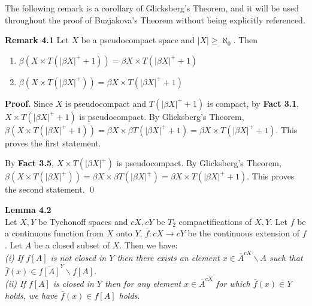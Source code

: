 \documentclass{article}
\begin{document}
																				      The following remark is a corollary of Glicksberg's Theorem, and it will be used throughout the proof of Buzjakova's Theorem without being explicitly referenced.

																				      \vskip 20pt






																				      \textbf{Remark 4.1} Let $X$ be a pseudocompact space and $|X|\geq \aleph_0.$ Then 


																				      \begin{enumerate}
																				      \item $\beta(X\times T(|\beta X|^+ +1))=\beta X\times T(|\beta X|^+ +1)$
																				      \item $\beta(X\times T(|\beta X|^+))=\beta X\times T(|\beta X|^+ +1)$

																				      \end{enumerate}


																				      \vskip 20pt


																				      \textbf{Proof.} Since $X$ is pseudocompact and  $T(|\beta X|^+ +1)$ is compact, by \textbf{Fact 3.1}, $X\times T(|\beta X|^+ +1)$ is pseudocompact. By Glicksberg's Theorem, $\beta(X\times T(|\beta X|^+ +1))=\beta X\times \beta T(|\beta X|^+ +1)=\beta X\times T(|\beta X|^+ +1).$ This proves the first statement.
																				      \vskip 15pt

																				      By \textbf{Fact 3.5}, $X\times T(|\beta X|^+)$ is pseudocompact. By Glicksberg's Theorem, $\beta(X\times T(|\beta X|^+))=\beta X\times \beta T(|\beta X|^+)=\beta X\times T(|\beta X|^+ +1)$. This proves the second statement. \qed

																				      \vskip 40pt


																				      \textbf{Lemma 4.2}\\
																					  Let $X,Y$ be Tychonoff spaces and $cX, cY$ be $T_2$ compactifications of $X,Y$.
																					  Let $f$ be a continuous function from $X$ onto $Y$, $\bar{f}: cX\rightarrow cY$ be the continuous extension of $f$. Let $A$ be a closed subset of $X$. Then we have: \\
																					      \emph{(i) If $f[A]$ is not closed in $Y$ then there exists an element $x\in \overline{A}^{cX} \backslash A$ such that $\bar{f}(x) \in \overline{f[A]}^{Y}\backslash f[A].$}\\
																					      \emph{(ii) If $f[A]$ is closed in $Y$ then for any element $x \in \overline{A}^{cX} $ for which $\bar{f}(x)\in Y $ holds, we have $\bar{f}(x) \in f[A]$ holds.}\\
\end{document}
